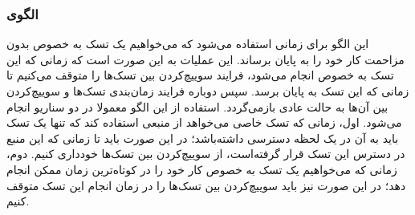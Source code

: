 \subsubsection{الگوی }
\label{scheduleCriticalRegSec}
\begin{RTL}
این الگو برای زمانی استفاده می‌شود که می‌خواهیم یک تسک به خصوص بدون مزاحمت کار
خود را به پایان برساند. این عملیات به این صورت است که زمانی که این تسک
به خصوص انجام می‌شود، فرایند سوییچ‌کردن بین تسک‌ها را متوقف می‌کنیم تا زمانی که
این تسک به پایان برسد. سپس دوباره فرایند زمان‌بندی تسک‌ها و سوییچ‌کردن بین آن‌ها
به حالت عادی بازمی‌گردد. استفاده از این الگو معمولا در دو سناریو انجام می‌شود.
اول، زمانی که تسک خاصی می‌خواهد از منبعی استفاده کند که تنها یک تسک باید
به آن در یک لحظه دسترسی داشته‌باشد؛ در این صورت باید تا زمانی که این منبع
در دسترس این تسک قرار گرفته‌است، از سوییچ‌کردن بین تسک‌ها خودداری کنیم.
دوم، زمانی که می‌خواهیم یک تسک به خصوص کار خود را در کوتاه‌ترین زمان ممکن
انجام دهد؛ در این صورت نیز باید سوییچ‌کردن بین تسک‌ها را در زمان انجام
این تسک متوقف کنیم.
\end{RTL}